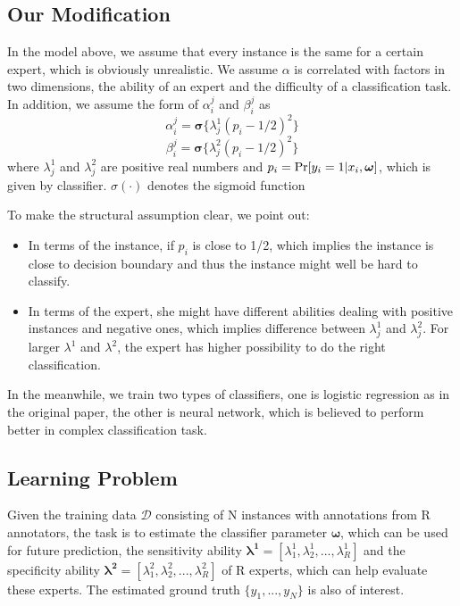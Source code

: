 \documentclass{article}
\begin{document}
\subsection{Our Modification}
In the model above, we assume that every instance is the same for a certain expert, which is obviously unrealistic. We assume $\alpha$ is correlated with factors in two dimensions, the ability of an expert and the difficulty of a classification task. In addition, we assume the form of $\alpha_{i}^{j}$ and 
$\beta_{i}^{j}$ as
$$\alpha_{i}^{j}=\bm{\sigma}\lbrace\lambda_{j}^{1}(p_{i}-1/2)^{2}\rbrace$$
$$\beta_{i}^{j}=\bm{\sigma}\lbrace\lambda_{j}^{2}(p_{i}-1/2)^{2}\rbrace$$
where $\lambda_j^1$ and $\lambda_j^2$ are positive real numbers and $p_i=\textup{Pr}[y_i=1|x_i, \bm{\omega}]$, which is given by classifier. $\sigma(\cdot)$ denotes the sigmoid function

To make the structural assumption clear, we point out:
\begin{itemize}
    \item In terms of the instance, if $p_i$ is close to 1/2, which implies the instance is close to decision boundary and thus the instance might well be hard to classify.
    \item In terms of the expert, she might have different abilities dealing with positive instances and negative ones, which implies difference between  $\lambda_j^1$ and $\lambda_j^2$. For larger $\lambda^{1}$ and $\lambda^{2}$, the expert has higher possibility to do the right classification.
\end{itemize}

In the meanwhile, we train two types of classifiers, one is logistic regression as in the original paper, the other is neural network, which is believed to perform better in complex classification task.

\subsection{Learning Problem}
Given the training data $\mathcal{D}$ consisting of N instances with annotations from R annotators, the task is to estimate the classifier parameter $\bm{\omega}$, which can be used for future prediction, the sensitivity ability $\bm{\lambda^1}=[\lambda_1^1,\lambda_2^1,...,\lambda_R^1]$ and the specificity ability $\bm{\lambda^2}=[\lambda_1^2,\lambda_2^2,...,\lambda_R^2]$ of R experts, which can help evaluate these experts. The estimated ground truth $\lbrace y_1,...,y_N\rbrace$ is also of interest.
\end{document}
